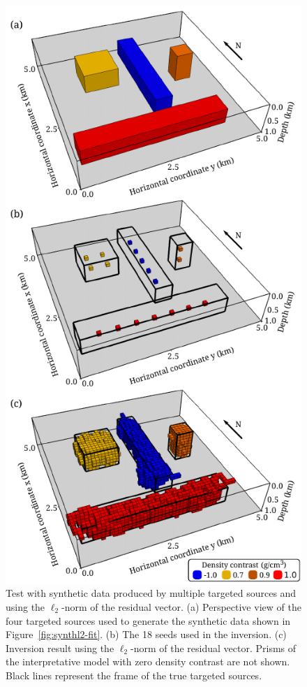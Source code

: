 \documentclass[twocolumn]{article}
\begin{document}
\begin{figure}[]
    \includegraphics{fig/synthetic-l2-result}
    \caption{
        Test with synthetic data produced by multiple targeted sources and
        using the $\ell_{2}$-norm of the residual vector.
        (a) Perspective view of the four targeted sources
        used to generate the synthetic data
        shown in Figure~\ref{fig:synthl2-fit}.
        (b) The 18 seeds used in the inversion. 
        (c) Inversion result using the $\ell_{2}$-norm of the residual vector.
        Prisms of the interpretative model
        with zero density contrast are not shown.
        Black lines represent the frame of the true targeted sources.
    \label{fig:synthl2-res}}
\end{figure}
\end{document}
